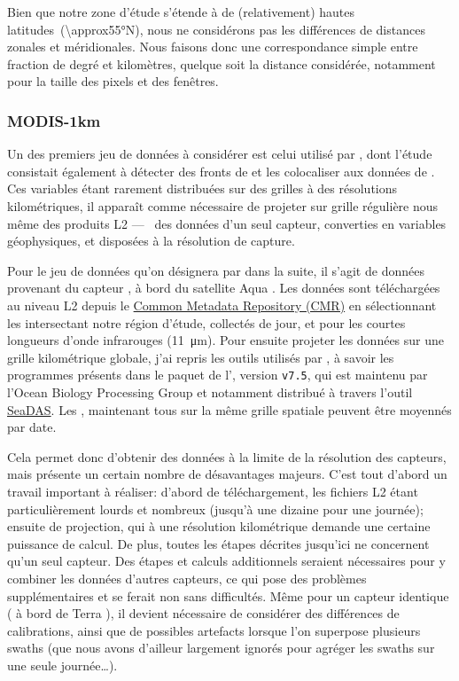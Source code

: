 \begin{note}
  Bien que notre zone d'étude s'étende à de (relativement) hautes latitudes~(\ang{\approx55}N), nous ne considérons pas les différences de distances zonales et méridionales.
  Nous faisons donc une correspondance simple entre fraction de degré et kilomètres, quelque soit la distance considérée, notamment pour la taille des pixels et des fenêtres.
\end{note}

\subsubsection{MODIS-1km}

Un des premiers jeu de données  à considérer est celui utilisé par \textcite{liu_2016}, dont l'étude consistait également à détecter des fronts de  et les colocaliser aux données de .
Ces variables étant rarement distribuées sur des grilles à des résolutions kilométriques, il apparaît comme nécessaire de projeter sur grille régulière nous même des produits L2 ---~ des données d'un seul capteur, converties en variables géophysiques, et disposées à la résolution de capture.

Pour le jeu de données qu'on désignera par  dans la suite, il s'agit de données provenant du capteur , à bord du satellite Aqua \parencite{kilpatrick_2015}.
Les données sont téléchargées au niveau L2 depuis le \href{https://cmr.earthdata.nasa.gov/search/}{Common Metadata Repository (CMR)} en sélectionnant les  intersectant notre région d'étude, collectés de jour, et pour les courtes longueurs d'onde infrarouges (\qty{11}{\um}).
Pour ensuite projeter les données sur une grille kilométrique globale, j'ai repris les outils utilisés par \citeauthor{liu_2016}, à savoir les programmes présents dans le paquet de l'\href{https://oceandata.sci.gsfc.nasa.gov/ocssw}{}, version \verb|v7.5|, qui est maintenu par l'Ocean Biology Processing Group et notamment distribué à travers l'outil \href{https://seadas.gsfc.nasa.gov/}{SeaDAS}.
Les , maintenant tous sur la même grille spatiale peuvent être moyennés par date.

Cela permet donc d'obtenir des données à la limite de la résolution des capteurs, mais présente un certain nombre de désavantages majeurs.
C'est tout d'abord un travail important à réaliser: d'abord de téléchargement, les fichiers L2 étant particulièrement lourds et nombreux (jusqu'à une dizaine pour une journée); ensuite de projection, qui à une résolution kilométrique demande une certaine puissance de calcul.
De plus, toutes les étapes décrites jusqu'ici ne concernent qu'un seul capteur.
Des étapes et calculs additionnels seraient nécessaires pour y combiner les données d'autres capteurs, ce qui pose des problèmes supplémentaires et se ferait non sans difficultés.
Même pour un capteur identique ( à bord de Terra ), il devient nécessaire de considérer des différences de calibrations, ainsi que de possibles artefacts lorsque l'on superpose plusieurs swaths (que nous avons d'ailleur largement ignorés pour agréger les swaths sur une seule journée\dots).

